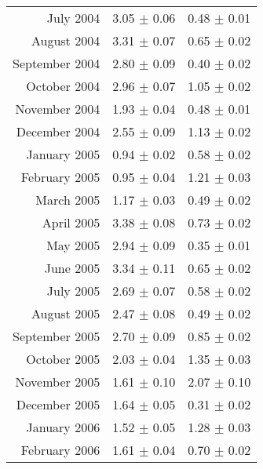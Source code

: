 \documentclass[a4paper,12pt]{article}
\begin{document}
\begin{center}
\begin{longtable}{|r|c|c|}
    July        2004    &       3.05    $\pm$   0.06    &       0.48    $\pm$   0.01    \\
    August      2004    &       3.31    $\pm$   0.07    &       0.65    $\pm$   0.02    \\
    September   2004    &       2.80    $\pm$   0.09    &       0.40    $\pm$   0.02    \\
    October     2004    &       2.96    $\pm$   0.07    &       1.05    $\pm$   0.02    \\
    November    2004    &       1.93    $\pm$   0.04    &       0.48    $\pm$   0.01    \\
    December    2004    &       2.55    $\pm$   0.09    &       1.13    $\pm$   0.02    \\
    January     2005    &       0.94    $\pm$   0.02    &       0.58    $\pm$   0.02    \\
    February    2005    &       0.95    $\pm$   0.04    &       1.21    $\pm$   0.03    \\
    March       2005    &       1.17    $\pm$   0.03    &       0.49    $\pm$   0.02    \\
    April       2005    &       3.38    $\pm$   0.08    &       0.73    $\pm$   0.02    \\
    May         2005    &       2.94    $\pm$   0.09    &       0.35    $\pm$   0.01    \\
    June        2005    &       3.34    $\pm$   0.11    &       0.65    $\pm$   0.02    \\
    July        2005    &       2.69    $\pm$   0.07    &       0.58    $\pm$   0.02    \\
    August      2005    &       2.47    $\pm$   0.08    &       0.49    $\pm$   0.02    \\
    September   2005    &       2.70    $\pm$   0.09    &       0.85    $\pm$   0.02    \\
    October     2005    &       2.03    $\pm$   0.04    &       1.35    $\pm$   0.03    \\
    November    2005    &       1.61    $\pm$   0.10    &       2.07    $\pm$   0.10    \\
    December    2005    &       1.64    $\pm$   0.05    &       0.31    $\pm$   0.02    \\
    January     2006    &       1.52    $\pm$   0.05    &       1.28    $\pm$   0.03    \\
    February    2006    &       1.61    $\pm$   0.04    &       0.70    $\pm$   0.02    \\

\end{longtable}
\end{center}
\end{document}
